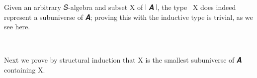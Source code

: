 \ccpad
Given an arbitrary \ab 𝑆-algebra  and subset \ab X of \af ∣ \ab 𝑨 \af ∣, the type ~\ab X does indeed represent a subuniverse of \ab 𝑨; proving this with the inductive type  is trivial, as we see here.
\ccpad
\begin{code}%
\>[0][@{}l@{\AgdaIndent{0}}]%
\>[1]\AgdaSpace{}%
\AgdaSymbol{:}\AgdaSpace{}%
\AgdaSymbol{\{}\AgdaSpace{}%
\AgdaSymbol{:}\AgdaSpace{}%
\AgdaSpace{}%
\AgdaSpace{}%
\AgdaSymbol{\}\{}\AgdaSpace{}%
\AgdaSymbol{:}\AgdaSpace{}%
\AgdaSpace{}%
\AgdaSpace{}%
\AgdaSpace{}%
\AgdaSpace{}%
\AgdaSymbol{\}}\AgdaSpace{}%
\AgdaSpace{}%
\AgdaSpace{}%
\AgdaSpace{}%
\AgdaSpace{}%
\AgdaSpace{}%
\AgdaSpace{}%
\<%
\\
%
\>[1]\AgdaSpace{}%
\AgdaSymbol{=}\AgdaSpace{}%
\<%
\end{code}
\ccpad
Next we prove by structural induction that  \ab X is the smallest subuniverse of \ab 𝑨 containing \ab X.
\ccpad
